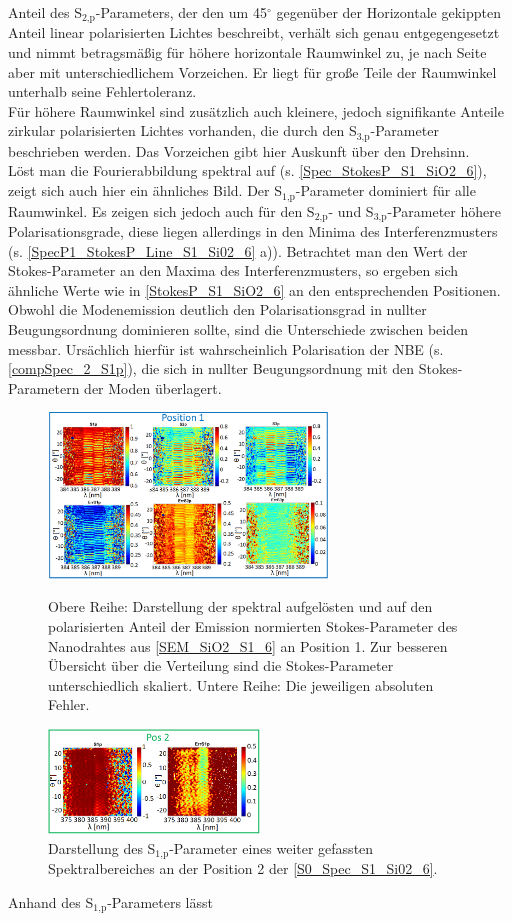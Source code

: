 Anteil des S$_\text{2,p}$-Parameters, der den um 45$^\circ$ gegenüber der
Horizontale gekippten Anteil linear polarisierten Lichtes beschreibt, verhält
sich genau entgegengesetzt und nimmt betragsmäßig für höhere horizontale
Raumwinkel zu, je nach Seite aber mit unterschiedlichem Vorzeichen. Er liegt für
große Teile der Raumwinkel unterhalb seine Fehlertoleranz.\\ Für höhere
Raumwinkel sind zusätzlich auch kleinere, jedoch signifikante Anteile zirkular
polarisierten Lichtes vorhanden, die durch den S$_\text{3,p}$-Parameter
beschrieben werden. Das Vorzeichen gibt hier Auskunft über den Drehsinn.\\ Löst
man die Fourierabbildung spektral auf (s. \autoref{Spec_StokesP_S1_SiO2_6}),
zeigt sich auch hier ein ähnliches Bild. Der S$_\text{1,p}$-Parameter dominiert
für alle Raumwinkel. Es zeigen sich jedoch auch für den S$_\text{2,p}$- und
S$_\text{3,p}$-Parameter höhere Polarisationsgrade, diese liegen allerdings in
den Minima des Interferenzmusters (s. \autoref{SpecP1_StokesP_Line_S1_Si02_6}
a)). Betrachtet man den Wert der Stokes-Parameter an den Maxima des
Interferenzmusters, so ergeben sich ähnliche Werte wie in
\autoref{StokesP_S1_SiO2_6} an den entsprechenden Positionen. Obwohl die
Modenemission deutlich den Polarisationsgrad in nullter Beugungsordnung
dominieren sollte, sind die Unterschiede zwischen beiden messbar. Ursächlich
hierfür ist wahrscheinlich Polarisation der NBE (s. \autoref{compSpec_2_S1p}),
die sich in nullter Beugungsordnung mit den Stokes-Parametern der Moden
überlagert.\begin{figure}[b]
\includegraphics[width=0.66\textwidth]{Bilder/SiO2/SpecP1_StokesP_S1_Si02_6}
\caption{Obere Reihe: Darstellung der spektral aufgelösten und auf den
polarisierten Anteil der Emission normierten Stokes-Parameter des Nanodrahtes
aus \autoref{SEM_SiO2_S1_6} an Position 1. Zur besseren Übersicht über die
Verteilung sind die Stokes-Parameter unterschiedlich skaliert. Untere Reihe: Die
jeweiligen absoluten Fehler.} \label{Spec_StokesP_S1_SiO2_6}
\includegraphics[width=0.5\textwidth]{Bilder/SiO2/compSpec_2_S1p}
\caption{Darstellung des S$_\text{1,p}$-Parameter eines weiter gefassten
Spektralbereiches an der Position 2 der \autoref{S0_Spec_S1_Si02_6}.}
\label{compSpec_2_S1p} \end{figure}Anhand des S$_\text{1,p}$-Parameters lässt
